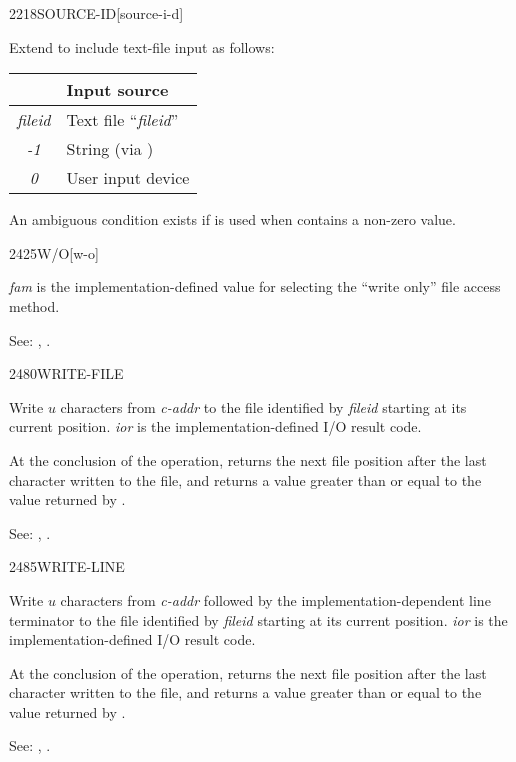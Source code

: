 \begin{newword}{2218}{SOURCE-ID}[source-i-d]

	Extend  to include text-file
	input as follows:
	\begin{center}
	  \begin{tabular}{cl}
		\hline\hline
		\word{SOURCE-ID} & Input source \\
		\hline
		\emph{fileid}	& Text file ``\emph{fileid}'' \\
		\emph{-1}		& String (via \word[core]{EVALUATE}) \\
		\emph{0}		& User input device \\
		\hline\hline
	  \end{tabular}
	\end{center}

	An ambiguous condition exists if  is used when
	 contains a non-zero value.
\end{newword}


\begin{newword}{2425}{W/O}[w-o]

	\emph{fam} is the implementation-defined value for selecting
	the ``write only'' file access method.

\item[See:]
	,
	.
\end{newword}


\begin{newword}{2480}{WRITE-FILE}

	Write $u$ characters from \emph{c-addr} to the file identified
	by \emph{fileid} starting at its current position. \emph{ior}
	is the implementation-defined I/O result code.

	At the conclusion of the operation,  returns
	the next file position after the last character written to the
	file, and  returns a value greater than or equal
	to the value returned by .

\item[See:]
	,
	.
\end{newword}


\begin{newword}{2485}{WRITE-LINE}

	Write $u$ characters from \emph{c-addr} followed by the
	implementation-dependent line terminator to the file identified
	by \emph{fileid} starting at its current position. \emph{ior} is
	the implementation-defined I/O result code.

	At the conclusion of the operation,  returns
	the next file position after the last character written to the
	file, and  returns a value greater than or equal
	to the value returned by .

\item[See:]
	,
	.
\end{newword}


